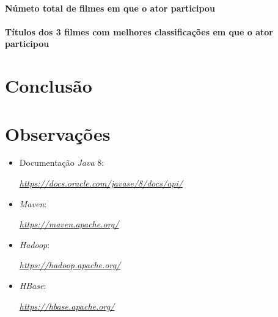 \documentclass[a4paper]{report}
\begin{document}
{			\subsubsection{Númeto total de filmes em que o ator participou} \label{sssec:Task2-3-2}

			\subsubsection{Títulos dos 3 filmes com melhores classificações em que o ator participou} \label{sssec:Task2-3-3}
}

\chapter{Conclusão} \label{ch:Conclusion}
\large{
	
}

\appendix
\chapter{Observações} \label{ch:Observations}
\begin{itemize}
    \item Documentação \textit{Java} 8:
    \par \textit{\url{https://docs.oracle.com/javase/8/docs/api/}}
	\item \textit{Maven}:
    \par \textit{\url{https://maven.apache.org/}}
    \item \textit{Hadoop}:
    \par \textit{\url{https://hadoop.apache.org/}}
    \item \textit{HBase}:
    \par \textit{\url{https://hbase.apache.org/}}
\end{itemize}
\end{document}
